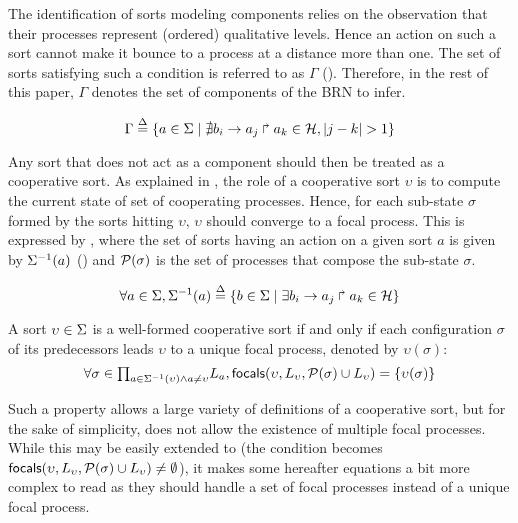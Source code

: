 The identification of sorts modeling components relies on the observation that their processes
represent (ordered) qualitative levels.
Hence an action on such a sort cannot make it bounce to a process at a distance more than one.
The set of sorts satisfying such a condition is referred to as $\Gamma$
().
Therefore, in the rest of this paper, $\Gamma$ denotes the set of components of the BRN to infer.

\begin{equation}
\Gamma \stackrel{\Delta}= \{a \in \Sigma \mid \nexists b_i\rightarrow a_j\Rsh a_k \in \mathcal{H}, |j - k| > 1\} \\
\label{eq:PH-components}
\end{equation}

Any sort that does not act as a component should then be treated as a cooperative sort.
As explained in , the role of a cooperative sort $\upsilon$ is to compute the current
state of set of cooperating processes.
Hence, for each sub-state $\sigma$ formed by the sorts hitting $\upsilon$, $\upsilon$ should
converge to a focal process.
This is expressed by , where
the set of sorts having an action on a given sort $a$ is given by 
$\Sigma^{-1}(a)$ ()
and $\mathcal{P}(\sigma)$ is the set of processes that compose the sub-state $\sigma$.

\begin{equation}
\forall a \in \Sigma, \Sigma^{-1}(a) \stackrel{\Delta}= \{b \in \Sigma \mid \exists b_i\rightarrow a_j\Rsh a_k\in\mathcal{H} \}
\label{eq:ph_direct_predec}
\end{equation}

\begin{property}\label{pro:wf-cooperative-sort}
A sort $\upsilon\in\Sigma$ is a well-formed cooperative sort if and only if
each configuration $\sigma$ of its predecessors leads $\upsilon$ to a unique focal process,
denoted by $\upsilon(\sigma)$:
\[
\forall \sigma \in {\textstyle\prod_{
a\in\Sigma^{-1}(\upsilon) \wedge a\neq \upsilon}}
L_{a},
\mathsf{focals}(\upsilon,L_\upsilon,\mathcal{P}(\sigma)\cup L_\upsilon) = \{ \upsilon(\sigma) \}\]
\end{property}

Such a property allows a large variety of definitions of a cooperative sort, but
for the sake of simplicity, does not allow the existence of multiple focal processes.
While this may be easily extended to (the condition becomes 
$\mathsf{focals}(\upsilon,L_\upsilon, \mathcal{P}(\sigma)\cup L_\upsilon)\neq\emptyset$), it makes some
hereafter equations a bit more complex to read as they should handle a set of focal processes instead
of a unique focal process.


